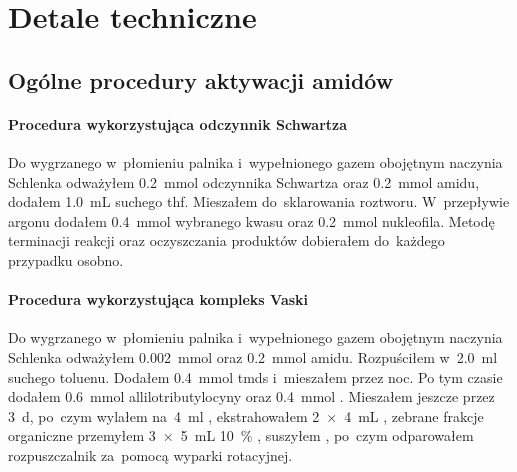 \chapter{Detale techniczne}\label{chapter:experimental}

\section{Ogólne procedury aktywacji amidów}\label{experimental:amidoester-activation}
\subsubsection{Procedura wykorzystująca odczynnik Schwartza}
Do wygrzanego w~płomieniu palnika i~wypełnionego gazem obojętnym naczynia Schlenka odważyłem
\SI{0.2}{\mmol} odczynnika Schwartza oraz \SI{0.2}{\mmol} amidu,
  dodałem \SI{1.0}{\mL} suchego \gls{thf}.
Mieszałem do~sklarowania roztworu.
W~przepływie argonu dodałem \SI{0.4}{\mmol} wybranego kwasu oraz \SI{0.2}{\mmol} nukleofila.
Metodę terminacji reakcji oraz oczyszczania produktów dobierałem do~każdego przypadku osobno.

\subsubsection{Procedura wykorzystująca kompleks Vaski}
Do wygrzanego w~płomieniu palnika i~wypełnionego gazem obojętnym naczynia Schlenka odważyłem
  \SI{0.002}{\mmol}  oraz \SI{0.2}{\mmol} amidu.
Rozpuściłem w~\SI{2.0}{\ml} suchego toluenu.
Dodałem \SI{0.4}{\mmol} \gls{tmds} i~mieszałem przez noc.
Po tym czasie dodałem \SI{0.6}{\mmol} allilotributylocyny oraz \SI{0.4}{\mmol} .
Mieszałem jeszcze przez \SI{3}{\day}, po~czym wylałem na~\SI{4}{\ml} ,
  ekstrahowałem \SI[product-units = single]{2 x 4}{\mL} , zebrane frakcje organiczne
  przemyłem \SI[product-units = single]{3 x 5}{\mL} \SI{10}{\percent} ,
  suszyłem , po~czym odparowałem rozpuszczalnik za~pomocą wyparki rotacyjnej.

